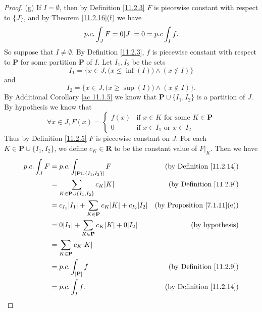 \begin{proof}{(g)}
    If \(I = \emptyset\), then by Definition \ref{11.2.3} \(F\) is piecewise constant with respect to \(\{J\}\), and by Theorem \ref{11.2.16}(f) we have
    \[
        p.c. \int_J F = 0 \abs*{J} = 0 = p.c \int_I f.
    \]
    So suppose that \(I \neq \emptyset\).
    By Definition \ref{11.2.3}, \(f\) is piecewise constant with respect to \(\mathbf{P}\) for some partition \(\mathbf{P}\) of \(I\).
    Let \(I_1, I_2\) be the sets
    \[
        I_1 = \Big\{x \in J, \big(x \leq \inf(I)\big) \land (x \notin I)\Big\}
    \]
    and
    \[
        I_2 = \Big\{x \in J, \big(x \geq \sup(I)\big) \land (x \notin I)\Big\}.
    \]
    By Additional Corollary \ref{ac 11.1.5} we know that \(\mathbf{P} \cup \{I_1, I_2\}\) is a partition of \(J\).
    By hypothesis we know that
    \[
        \forall x \in J, F(x) = \begin{cases}
            f(x) & \text{if } x \in K \text{ for some } K \in \mathbf{P} \\
            0    & \text{if } x \in I_1 \text{ or } x \in I_2
        \end{cases}
    \]
    Thus by Definition \ref{11.2.5} \(F\) is piecewise constant on \(J\).
    For each \(K \in \mathbf{P} \cup \{I_1, I_2\}\), we define \(c_K \in \mathbf{R}\) to be the constant value of \(F|_K\).
    Then we have
    \begin{align*}
        p.c. \int_J F & = p.c. \int_{[\mathbf{P} \cup \{I_1, I_2\}]} F                                   & \text{(by Definition \ref{11.2.14})}    \\
                      & = \sum_{K \in \mathbf{P} \cup \{I_1, I_2\}} c_K \abs*{K}                         & \text{(by Definition \ref{11.2.9})}     \\
                      & = c_{I_1} \abs*{I_1} + \sum_{K \in \mathbf{P}} c_K \abs*{K} + c_{I_2} \abs*{I_2} & \text{(by Proposition \ref{7.1.11}(e))} \\
                      & = 0 \abs*{I_1} + \sum_{K \in \mathbf{P}} c_K \abs*{K} + 0 \abs*{I_2}             & \text{(by hypothesis)}                  \\
                      & = \sum_{K \in \mathbf{P}} c_K \abs*{K}                                                                                     \\
                      & = p.c. \int_{[\mathbf{P}]} f                                                     & \text{(by Definition \ref{11.2.9})}     \\
                      & = p.c. \int_I f.                                                                 & \text{(by Definition \ref{11.2.14})}
    \end{align*}
\end{proof}

